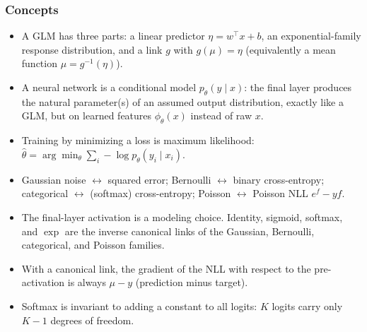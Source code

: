 \documentclass[11pt]{article}
\begin{document}
\subsubsection*{Concepts}
\begin{itemize}
  \item A GLM has three parts: a linear predictor $\eta = w^\top x + b$, an exponential-family response distribution, and a link $g$ with $g(\mu) = \eta$ (equivalently a mean function $\mu = g^{-1}(\eta)$).
  \item A neural network is a conditional model $p_\theta(y\mid x)$: the final layer produces the natural parameter(s) of an assumed output distribution, exactly like a GLM, but on learned features $\phi_\theta(x)$ instead of raw $x$.
  \item Training by minimizing a loss is maximum likelihood: $\hat\theta = \arg\min_\theta \sum_i -\log p_\theta(y_i\mid x_i)$.
  \item Gaussian noise $\leftrightarrow$ squared error; Bernoulli $\leftrightarrow$ binary cross-entropy; categorical $\leftrightarrow$ (softmax) cross-entropy; Poisson $\leftrightarrow$ Poisson NLL $e^{f} - y f$.
  \item The final-layer activation is a modeling choice. Identity, sigmoid, softmax, and $\exp$ are the inverse canonical links of the Gaussian, Bernoulli, categorical, and Poisson families.
  \item With a canonical link, the gradient of the NLL with respect to the pre-activation is always $\mu - y$ (prediction minus target).
  \item Softmax is invariant to adding a constant to all logits: $K$ logits carry only $K-1$ degrees of freedom.
\end{itemize}
\end{document}
